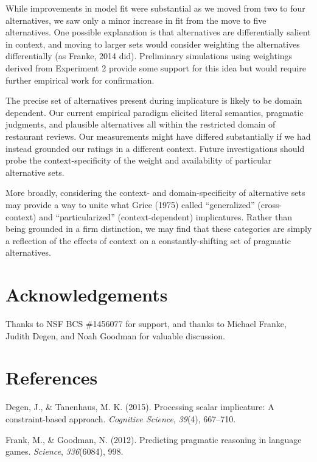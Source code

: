 \documentclass[10pt, letterpaper]{article}
\begin{document}
While improvements in model fit were substantial as we moved from two to
four alternatives, we saw only a minor increase in fit from the move to
five alternatives. One possible explanation is that alternatives are
differentially salient in context, and moving to larger sets would
consider weighting the alternatives differentially (as Franke, 2014
did). Preliminary simulations using weightings derived from Experiment 2
provide some support for this idea but would require further empirical
work for confirmation.

The precise set of alternatives present during implicature is likely to
be domain dependent. Our current empirical paradigm elicited literal
semantics, pragmatic judgments, and plausible alternatives all within
the restricted domain of restaurant reviews. Our measurements might have
differed substantially if we had instead grounded our ratings in a
different context. Future investigations should probe the
context-specificity of the weight and availability of particular
alternative sets.

More broadly, considering the context- and domain-specificity of
alternative sets may provide a way to unite what Grice (1975) called
``generalized'' (cross-context) and ``particularized''
(context-dependent) implicatures. Rather than being grounded in a firm
distinction, we may find that these categories are simply a reflection
of the effects of context on a constantly-shifting set of pragmatic
alternatives.

\section{Acknowledgements}\label{acknowledgements}

Thanks to NSF BCS \#1456077 for support, and thanks to Michael Franke,
Judith Degen, and Noah Goodman for valuable discussion.

\section{References}\label{references}

\setlength{\parindent}{-0.1in} \setlength{\leftskip}{0.125in} \noindent

Degen, J., \& Tanenhaus, M. K. (2015). Processing scalar implicature: A
constraint-based approach. \emph{Cognitive Science}, \emph{39}(4),
667--710.

Frank, M., \& Goodman, N. (2012). Predicting pragmatic reasoning in
language games. \emph{Science}, \emph{336}(6084), 998.
\end{document}
